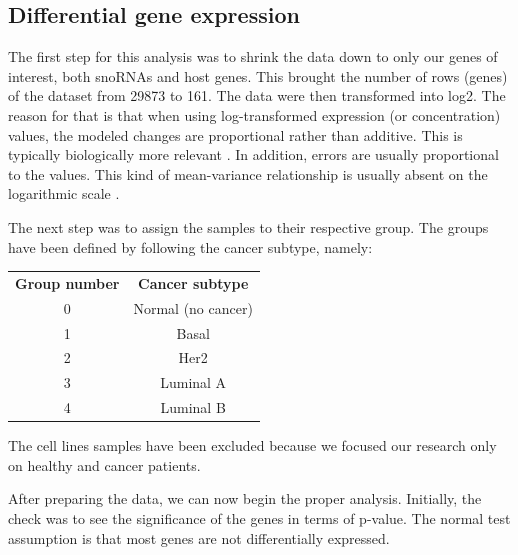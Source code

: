 \documentclass[journal]{IEEEtran}
\begin{document}
\subsection{Differential gene expression}
The first step for this analysis was to shrink the data down to only our genes of interest, both snoRNAs and host genes. This brought the number of rows (genes) of the dataset from 29873 to 161. The data were then transformed into log2. The reason for that is that when using log-transformed expression (or concentration) values, the modeled changes are proportional rather than additive. This is typically biologically more relevant \cite{post}. In addition, errors are usually proportional to the values. This kind of mean-variance relationship is usually absent on the logarithmic scale \cite{post}.

The next step was to assign the samples to their respective group. The groups have been defined by following the cancer subtype, namely:
\begin{table}[!ht]
    \centering
    \begin{tabular}{c|c}
         \textbf{Group number} & \textbf{Cancer subtype} \\
         0 & Normal (no cancer) \\
         1 & Basal \\
         2 & Her2 \\
         3 & Luminal A \\
         4 & Luminal B
    \end{tabular}    
\end{table}
The cell lines samples have been excluded because we focused our research only on healthy and cancer patients.

After preparing the data, we can now begin the proper analysis. Initially, the check was to see the significance of the genes in terms of p-value. The normal test assumption is that most genes are not differentially expressed.


\end{document}
